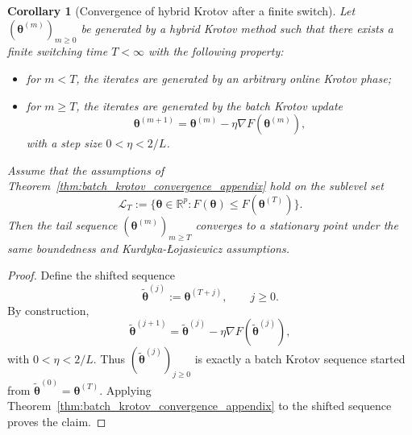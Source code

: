 \documentclass[aps,prb,10pt,twocolumn,superscriptaddress]{revtex4-2}
\newtheorem{corollary}[theorem]{Corollary}
\begin{document}
\begin{corollary}[Convergence of hybrid Krotov after a finite switch]
\label{cor:hybrid_krotov_convergence_appendix}
Let \((\bm{\theta}^{(m)})_{m\geq 0}\) be generated by a hybrid Krotov method such that there exists a finite switching time \(T<\infty\) with the following property:
\begin{itemize}
    \item for \(m<T\), the iterates are generated by an arbitrary online Krotov phase;
    \item for \(m\geq T\), the iterates are generated by the batch Krotov update
    \[
    \bm{\theta}^{(m+1)}
    =
    \bm{\theta}^{(m)}-\eta \nabla F(\bm{\theta}^{(m)}),
    \]
    with a step size \(0<\eta<2/L\).
\end{itemize}
Assume that the assumptions of Theorem~\ref{thm:batch_krotov_convergence_appendix} hold on the sublevel set
\[
\mathcal{L}_T:=\{\bm{\theta}\in\mathbb{R}^p : F(\bm{\theta})\leq F(\bm{\theta}^{(T)})\}.
\]
Then the tail sequence \((\bm{\theta}^{(m)})_{m\geq T}\) converges to a stationary point under the same boundedness and Kurdyka-\L{}ojasiewicz assumptions.
\end{corollary}

\begin{proof}
Define the shifted sequence
\[
\widetilde{\bm{\theta}}^{(j)}:=\bm{\theta}^{(T+j)}, \qquad j\geq 0.
\]
By construction,
\[
\widetilde{\bm{\theta}}^{(j+1)}
=
\widetilde{\bm{\theta}}^{(j)}-\eta \nabla F(\widetilde{\bm{\theta}}^{(j)}),
\]
with \(0<\eta<2/L\). Thus \((\widetilde{\bm{\theta}}^{(j)})_{j\geq 0}\) is exactly a batch Krotov sequence started from \(\widetilde{\bm{\theta}}^{(0)}=\bm{\theta}^{(T)}\). Applying Theorem~\ref{thm:batch_krotov_convergence_appendix} to the shifted sequence proves the claim.
\end{proof}
\end{document}

